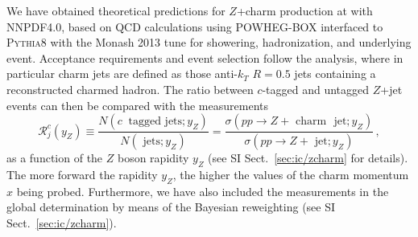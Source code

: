We have obtained  theoretical predictions for $Z$+charm production
at \lhcb with NNPDF4.0, based on
\nlo QCD calculations using
\textsc{\small POWHEG-BOX} 
interfaced to \textsc{\small Pythia8}
with the Monash 2013 tune for showering,
hadronization, and underlying event.
%
Acceptance requirements and event selection follow the \lhcb analysis,
where in particular charm jets are defined as those anti-$k_T$ $R=0.5$ jets
containing a reconstructed charmed hadron.
%
The ratio between $c$-tagged and untagged $Z$+jet events can then
be compared with the \lhcb measurements
\begin{equation}
  \mathcal{R}_j^c(y_Z) \equiv \frac{N(c~\textrm{ tagged~jets};y_Z)}{ 
    N(\textrm{ jets};y_Z)} =
  \frac{\sigma(pp\to Z+\textrm{ charm~ jet};y_Z)}{\sigma(pp \to Z+\textrm{ jet};y_Z)} \, ,
\end{equation}
as a function of the $Z$ boson rapidity $y_Z$ (see SI Sect.~\ref{sec:ic/zcharm} for details).
%
The more forward the rapidity $y_{Z}$, the higher the values of the charm
momentum $x$ being probed.
%
Furthermore, we have also included the \lhcb measurements in the global \pdf
determination by means of the Bayesian reweighting (see SI
Sect.~\ref{sec:ic/zcharm}).
